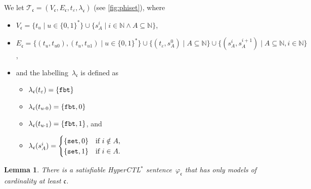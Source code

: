 \documentclass[dvipsnames,10pt,a4paper]{amsart}
\newtheorem{lem}[thm]{Lemma}
\theoremstyle{definition}
\theoremstyle{remark}
\newcommand{\contcard}{\cont}
\newcommand{\nats}{\mathbb{N}}
\newcommand\Nat{\nats}
\newcommand{\cont}{\mathfrak{c}}
\newcommand{\tsys}{\mathcal{T}}
\newcommand{\hyctlstar}{{HyperCTL$^*$}\xspace}
\newcommand\fbt{\textup{\texttt{fbt}}}
\newcommand\pset{\textup{\texttt{set}}}
\newcommand\phiset{\varphi_{\cont}}
\newcommand\Kset{\tsys_{\cont}}
\begin{document}
We let $\Kset = (V_\cont,E_\cont,t_\varepsilon,\lambda_\cont)$ (see \autoref{fig:phiset}), where
\begin{itemize}
	\item $V_\cont = \{t_u \mid u \in \{0,1\}^\ast\}
      \cup \{s^i_A \mid i \in \Nat \land A \subseteq \Nat\}$,
      \item $E_\cont
    = \{(t_u,t_{u0}),(t_u,t_{u1}) \mid u \in \{0,1\}^\ast\} \cup {} 
      \{ (t_\varepsilon, s^0_A) \mid A \subseteq \Nat \} \cup
      \{ (s^i_A,s^{i+1}_A) \mid A \subseteq \Nat, i \in \Nat \}$,
      \item and the labelling~$\lambda_\cont$ is defined as 
      \begin{itemize}
      	\item $\lambda_\cont(t_\varepsilon)  = \{\fbt\}$
      	\item $\lambda_\cont(t_{u \cdot 0}) = \{\fbt,0\}$
      	\item $\lambda_\cont(t_{u \cdot 1}) = \{\fbt,1\}$, and 
		\item $\lambda_\cont(s^i_A) = \begin{cases}
    \{\pset,0\} & \text{if } i \notin A, \\
    \{\pset,1\} & \text{if } i \in A.
  \end{cases}$      	
      \end{itemize} 
\end{itemize}

\begin{lem}\label{lem:phiset}
There is a satisfiable \hyctlstar sentence~$\phiset$ that has only models of cardinality at least $\contcard$.
\end{lem}
\end{document}
